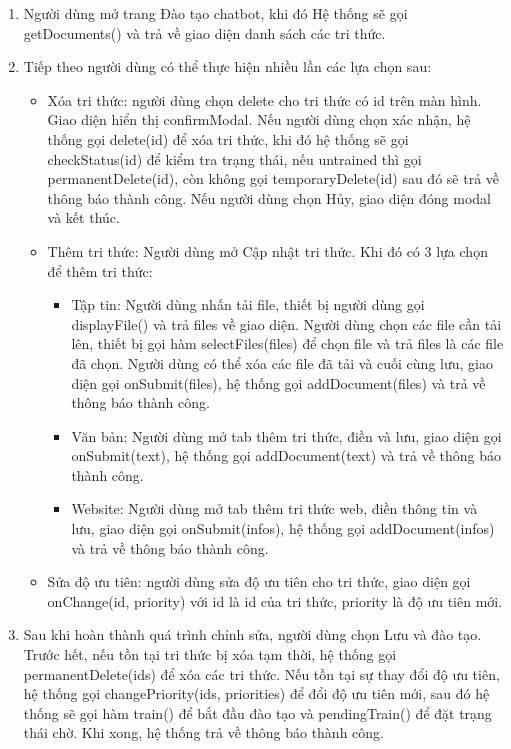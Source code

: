 \begin{enumerate}
	\item Người dùng mở trang Đào tạo chatbot, khi đó Hệ thống sẽ gọi getDocuments() và trả về giao diện danh sách các tri thức.
	\item Tiếp theo người dùng có thể thực hiện nhiều lần các lựa chọn sau:
	\begin{itemize}
		\item Xóa tri thức: người dùng chọn delete cho tri thức có id trên màn hình. Giao diện hiển thị confirmModal. Nếu người dùng chọn xác nhận, hệ thống gọi delete(id) để xóa tri thức, khi đó hệ thống sẽ gọi checkStatus(id) để kiểm tra trạng thái, nếu untrained thì gọi permanentDelete(id), còn không gọi temporaryDelete(id) sau đó sẽ trả về thông báo thành công. Nếu người dùng chọn Hủy, giao diện đóng modal và kết thúc.
		\item Thêm tri thức: Người dùng mở Cập nhật tri thức. Khi đó có 3 lựa chọn để thêm tri thức:
		\begin{itemize}
			\item Tập tin: Người dùng nhấn tải file, thiết bị người dùng gọi displayFile() và trả files về giao diện. Người dùng chọn các file cần tải lên, thiết bị gọi hàm selectFiles(files) để chọn file và trả files là các file đã chọn. Người dùng có thể xóa các file đã tải và cuối cùng lưu, giao diện gọi onSubmit(files), hệ thống gọi addDocument(files) và trả về thông báo thành công.
			\item Văn bản: Người dùng mở tab thêm tri thức, điền và lưu, giao diện gọi onSubmit(text), hệ thống gọi addDocument(text) và trả về thông báo thành công.
			\item Website: Người dùng mở tab thêm tri thức web, điền thông tin và lưu, giao diện gọi onSubmit(infos), hệ thống gọi addDocument(infos) và trả về thông báo thành công. 
		\end{itemize}
		\item Sửa độ ưu tiên: người dùng sửa độ ưu tiên cho tri thức, giao diện gọi onChange(id, priority) với id là id của tri thức, priority là độ ưu tiên mới.
	\end{itemize}
	\item Sau khi hoàn thành quá trình chỉnh sửa, người dùng chọn Lưu và đào tạo. Trước hết, nếu tồn tại tri thức bị xóa tạm thời, hệ thống gọi permanentDelete(ids) để xóa các tri thức. Nếu tồn tại sự thay đổi độ ưu tiên, hệ thống gọi changePriority(ids, priorities) để đổi độ ưu tiên mới, sau đó hệ thống sẽ gọi hàm train() để bắt đầu đào tạo và pendingTrain() để đặt trạng thái chờ. Khi xong, hệ thống trả về thông báo thành công.
\end{enumerate}

